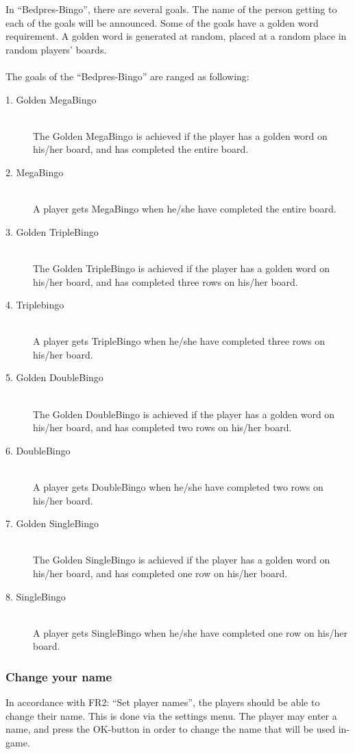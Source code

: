 In ``Bedpres-Bingo'', there are several goals. The name of the person
getting to each of the goals will be announced. Some of the goals have
a golden word requirement. A golden word is generated at random, placed
at a random place in random players' boards.\\\\
The goals of the ``Bedpres-Bingo'' are ranged as following:
\begin{description}
	\item[1. Golden MegaBingo]\hfill \\
		{The Golden MegaBingo is achieved if the player has a golden
		word on his/her board, and has completed the entire board.}
	\item[2. MegaBingo]\hfill \\
		{A player gets MegaBingo when he/she have completed the entire
		board.}
	\item[3. Golden TripleBingo]\hfill \\
		{The Golden TripleBingo is achieved if the player has a golden
		word on his/her board, and has completed three rows on his/her
		board.}
	\item[4. Triplebingo]\hfill \\
		{A player gets TripleBingo when he/she have completed three
		rows on his/her board.}
	\item[5. Golden DoubleBingo]\hfill \\
		{The Golden DoubleBingo is achieved if the player has a golden
		word on his/her board, and has completed two rows on his/her
		board.}
	\item[6. DoubleBingo]\hfill \\
		{A player gets DoubleBingo when he/she have completed two
		rows on his/her board.}
	\item[7. Golden SingleBingo]\hfill \\
		{The Golden SingleBingo is achieved if the player has a golden
		word on his/her board, and has completed one row on his/her
		board.}
	\item[8. SingleBingo]\hfill \\
		{A player gets SingleBingo when he/she have completed one
		row on his/her board.}
\end{description}


\subsubsection{Change your name}
In accordance with FR2: ``Set player names'', the players should be able to
change their name. This is done via the settings menu. The player may enter a
name, and press the OK-button in order to change the name that will be used
in-game.


